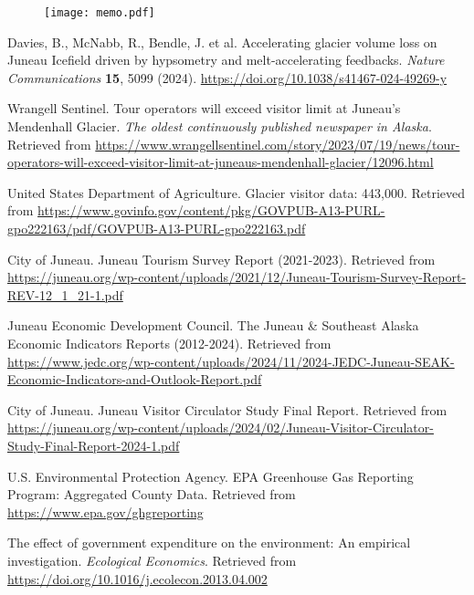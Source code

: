 \documentclass{mcmthesis}
\begin{document}
\begin{figure}[p] %
  \centering
  \texttt{[image: memo.pdf]} %
  \label{fig:fullpage}
\end{figure}

\restoregeometry %
\begin{thebibliography}{99}
  Davies, B., McNabb, R., Bendle, J. et al. 
  Accelerating glacier volume loss on Juneau Icefield driven by hypsometry and melt-accelerating feedbacks. 
  \textit{Nature Communications} \textbf{15}, 5099 (2024). 
  \url{https://doi.org/10.1038/s41467-024-49269-y}
  
  Wrangell Sentinel. 
  Tour operators will exceed visitor limit at Juneau's Mendenhall Glacier. 
  \emph{The oldest continuously published newspaper in Alaska}. 
  Retrieved from \url{https://www.wrangellsentinel.com/story/2023/07/19/news/tour-operators-will-exceed-visitor-limit-at-juneaus-mendenhall-glacier/12096.html}
  
  United States Department of Agriculture. 
  Glacier visitor data: 443,000. 
  Retrieved from \url{https://www.govinfo.gov/content/pkg/GOVPUB-A13-PURL-gpo222163/pdf/GOVPUB-A13-PURL-gpo222163.pdf}
  
  City of Juneau. 
  Juneau Tourism Survey Report (2021-2023). 
  Retrieved from \url{https://juneau.org/wp-content/uploads/2021/12/Juneau-Tourism-Survey-Report-REV-12_1_21-1.pdf}
  
  Juneau Economic Development Council. 
  The Juneau \& Southeast Alaska Economic Indicators Reports (2012-2024). 
  Retrieved from \url{https://www.jedc.org/wp-content/uploads/2024/11/2024-JEDC-Juneau-SEAK-Economic-Indicators-and-Outlook-Report.pdf}
  
  City of Juneau. 
  Juneau Visitor Circulator Study Final Report. 
  Retrieved from \url{https://juneau.org/wp-content/uploads/2024/02/Juneau-Visitor-Circulator-Study-Final-Report-2024-1.pdf}
  
  U.S. Environmental Protection Agency. 
  EPA Greenhouse Gas Reporting Program: Aggregated County Data. 
  Retrieved from \url{https://www.epa.gov/ghgreporting}
  
  The effect of government expenditure on the environment: An empirical investigation. 
  \emph{Ecological Economics}. 
  Retrieved from \url{https://doi.org/10.1016/j.ecolecon.2013.04.002}
  

\end{thebibliography}
\end{document}
